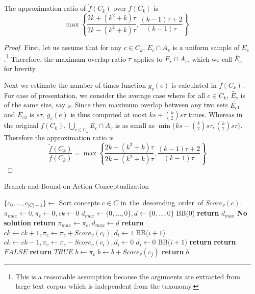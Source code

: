 \begin{lemma}
The approximation ratio of $\tilde{f}(C_k)$ over $f(C_k)$ is
\[\max \left\{
	\frac{2k + (k^2 + k) \tau}{2k - (k^2 + k) \tau},
	\frac{(k-1)\tau + 2}{(k-1)\tau}\right\}.\]
\end{lemma}
\begin{proof}
First, let us assume that for any $c \in C_k$, $E_c \cap A_v$ is a uniform
sample of $E_c$.\footnote{This is a reasonable assumption because the arguments
are extracted from large text corpus which is independent from the taxonomy.}
Therefore, the maximum overlap ratio $\tau$ applies
to $E_c \cap A_v$, which we call $\tilde{E_c}$ for brevity.

Next we estimate the number of times function $g_v(e)$
is calculated in $\tilde{f}(C_k)$. For ease of presentation,
we consider the average case where for all $c \in C_k$,
$\tilde{E_c}$ is of the same size, say $s$. Since then maximum overlap
between any two sets $\tilde{E_{c1}}$ and $\tilde{E_{c2}}$ is $s\tau$,
$g_v(e)$ is thus computed at most $ks + {k\choose 2}s\tau$ times.
Whereas in the original $f(C_k)$,
$\bigcup_{c \in C_k} E_c \cap A_v$
is as small as $\min\{ks - {k\choose 2}s\tau, {k\choose2}s\tau\}$.
Therefore the approximation ratio is
\[\frac{\tilde{f}(C_k)}{f(C_k)} = \max \left\{
	\frac{2k + (k^2 + k) \tau}{2k - (k^2 + k) \tau},
	\frac{(k-1)\tau + 2}{(k-1)\tau}\right\}
\]
\end{proof}

\begin{algorithm}[th]
\caption{Branch-and-Bound on Action Conceptualization}
\label{al:backtrack}
\begin{algorithmic}[1]
\State $\{c_0,...,c_{|C|-1}\}\leftarrow$ Sort concepts $c\in C$ in\ the\ descending\ order\ of $Score_v(c)$.
\State $\pi_{max} \leftarrow 0,\pi_{c} \leftarrow 0,ck \leftarrow 0$
\State $d_{max}\leftarrow\{0,...,0\},d\leftarrow\{0,...,0\}$
\State BB($0$)
\State \textbf{return} $d_{max}$
\Else
\State \textbf{No solution}
\EndIf
\EndFunction
\Statex
{}
\State \textbf{return}
\EndIf
{}
\State $\pi_{max} \leftarrow \pi_{c}, d_{max} \leftarrow d$
\EndIf
\State \textbf{return}
\EndIf
{}
\State $ck \leftarrow ck+1, \pi_{c} \leftarrow \pi_{c}+Score_v(c_i), d_i \leftarrow 1$
\State BB($i+1$)
\State $ck \leftarrow ck-1, \pi_{c} \leftarrow \pi_{c}-Score_v(c_i), d_i \leftarrow 0$
\EndIf
{}
\State $d_i \leftarrow 0$
\State BB($i+1$)
\EndIf
\State \textbf{return}
\EndFunction
\Statex
{}
\State \textbf{return} $FALSE$
\EndIf
\EndIf
\EndFor
\State \textbf{return} $TRUE$
\EndFunction
\Statex
{}
\State $b \leftarrow \pi_{c}$
\State $b \leftarrow b+Score_v(c_{j})$
\EndFor
\State \textbf{return} $b$
\EndFunction
\end{algorithmic}
\end{algorithm}

